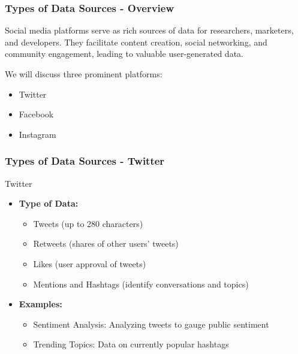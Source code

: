 \documentclass{beamer}
\begin{document}
\begin{frame}[fragile]
    \frametitle{Types of Data Sources - Overview}
    Social media platforms serve as rich sources of data for researchers, marketers, and developers. 
    They facilitate content creation, social networking, and community engagement, leading to valuable user-generated data.
    
    We will discuss three prominent platforms:
    \begin{itemize}
        \item Twitter
        \item Facebook
        \item Instagram
    \end{itemize}
\end{frame}

\begin{frame}[fragile]
    \frametitle{Types of Data Sources - Twitter}
    \begin{block}{Twitter}
        \begin{itemize}
            \item \textbf{Type of Data:}
            \begin{itemize}
                \item Tweets (up to 280 characters)
                \item Retweets (shares of other users' tweets)
                \item Likes (user approval of tweets)
                \item Mentions and Hashtags (identify conversations and topics)
            \end{itemize}
            \item \textbf{Examples:}
            \begin{itemize}
                \item Sentiment Analysis: Analyzing tweets to gauge public sentiment
                \item Trending Topics: Data on currently popular hashtags
            \end{itemize}
        \end{itemize}
    \end{block}
\end{frame}
\end{document}
